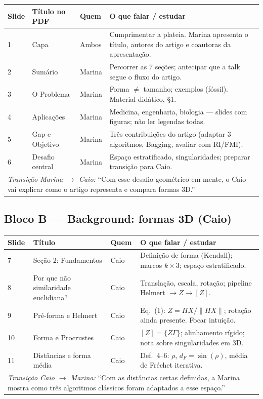 \documentclass[12pt,a4paper]{article}
\begin{document}
\begin{longtable}{@{}p{1.2cm}p{5.5cm}p{2.2cm}p{5.8cm}@{}}
\toprule
\textbf{Slide} & \textbf{Título no PDF} & \textbf{Quem} & \textbf{O que falar / estudar} \\
\midrule
\endhead
1 & Capa & Ambos & Cumprimentar a plateia. Marina apresenta o título, autores do artigo e coautoras da apresentação. \\
2 & Sumário & Marina & Percorrer as 7 seções; antecipar que a talk segue o fluxo do artigo. \\
3 & O Problema & Marina & Forma $\neq$ tamanho; exemplos (fóssil). Material didático, \S1. \\
4 & Aplicações & Marina & Medicina, engenharia, biologia --- slides com figuras; não ler legendas todas. \\
5 & Gap e Objetivo & Marina & Três contribuições do artigo (adaptar 3 algoritmos, Bagging, avaliar com RI/FMI). \\
6 & Desafio central & Marina & Espaço estratificado, singularidades; preparar transição para Caio. \\
\midrule
\multicolumn{4}{l}{\textit{Transição Marina $\rightarrow$ Caio:} ``Com esse desafio geométrico em mente, o Caio vai explicar como o artigo representa e compara formas 3D.''} \\
\bottomrule
\end{longtable}

\subsection{Bloco B --- Background: formas 3D (Caio)}

\begin{longtable}{@{}p{1.2cm}p{5.5cm}p{2.2cm}p{5.8cm}@{}}
\toprule
\textbf{Slide} & \textbf{Título} & \textbf{Quem} & \textbf{O que falar / estudar} \\
\midrule
\endhead
7 & Seção 2: Fundamentos & Caio & Definição de forma (Kendall); marcos $k\times 3$; espaço estratificado. \\
8 & Por que não similaridade euclidiana? & Caio & Translação, escala, rotação; pipeline Helmert $\rightarrow Z \rightarrow [Z]$. \\
9 & Pré-forma e Helmert & Caio & Eq.\ (1): $Z = HX/\|HX\|$; rotação ainda presente. Focar intuição. \\
10 & Forma e Procrustes & Caio & $[Z] = \{Z\Gamma\}$; alinhamento rígido; nota sobre singularidades em 3D. \\
11 & Distâncias e forma média & Caio & Def.\ 4--6: $\rho$, $d_F = \sin(\rho)$, média de Fréchet iterativa. \\
\midrule
\multicolumn{4}{l}{\textit{Transição Caio $\rightarrow$ Marina:} ``Com as distâncias certas definidas, a Marina mostra como três algoritmos clássicos foram adaptados a esse espaço.''} \\
\bottomrule
\end{longtable}
\end{document}
